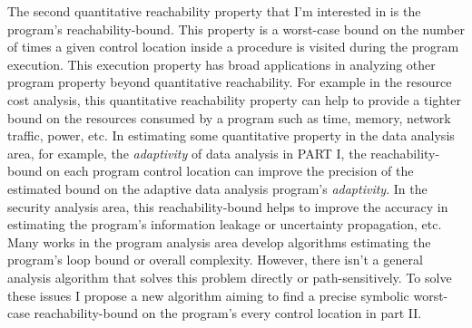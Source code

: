 

The second quantitative reachability property that I'm interested in is the program's reachability-bound.
This property is a worst-case bound on the number of times a given control location 
 inside a procedure is visited during the program execution.
This execution property has broad
applications in analyzing other program property beyond quantitative reachability.
For example in the resource cost analysis, this quantitative reachability property
can help to provide a tighter
bound on the resources consumed by a program such as time, memory,
network traffic, power, etc.
In estimating some quantitative property
in the data analysis area, for example, the \emph{adaptivity}
of data analysis in PART I, the reachability-bound on each program control location
can improve the precision of the estimated bound on the adaptive data analysis program's \emph{adaptivity}.
In the security analysis area, this reachability-bound helps to improve the accuracy
in estimating the program's information leakage or uncertainty propagation, etc.
Many works in the program analysis area develop algorithms estimating the program's loop bound or overall complexity.
However, there isn't a general analysis algorithm that solves this problem directly or path-sensitively.
To solve these issues
I propose a new algorithm
aiming to find a precise symbolic worst-case reachability-bound on the program's every control location
in part II.



